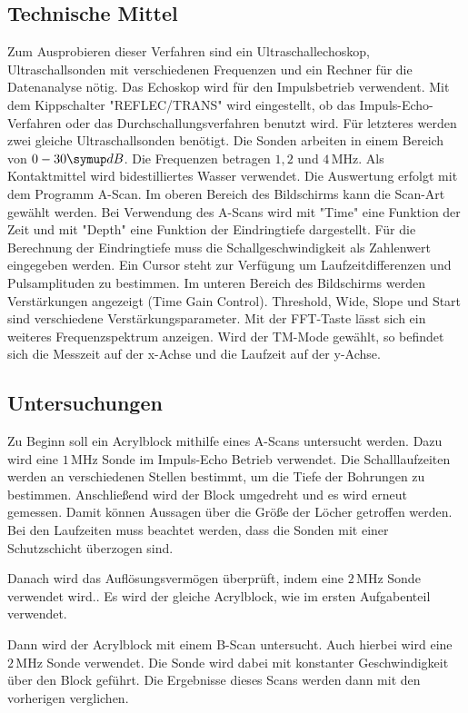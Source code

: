 \subsection{Technische Mittel}
Zum Ausprobieren dieser Verfahren sind ein Ultraschallechoskop, Ultraschallsonden
mit verschiedenen Frequenzen und ein Rechner für die Datenanalyse nötig. Das
Echoskop wird für den Impulsbetrieb verwendent. Mit dem Kippschalter
"REFLEC/TRANS" wird eingestellt, ob das Impuls-Echo-Verfahren oder das
Durchschallungsverfahren benutzt wird. Für letzteres werden zwei gleiche
Ultraschallsonden benötigt. Die Sonden arbeiten in einem Bereich von $0-30 \su{dB}$.
Die Frequenzen betragen $1,2$ und $4 \,\si{\mega\hertz}$. Als Kontaktmittel
wird bidestilliertes Wasser verwendet. Die Auswertung erfolgt mit dem
Programm A-Scan. Im oberen Bereich des Bildschirms kann die Scan-Art gewählt werden.
Bei Verwendung des A-Scans wird mit "Time" eine Funktion der Zeit und mit "Depth"
eine Funktion der Eindringtiefe dargestellt. Für die Berechnung der Eindringtiefe
muss die Schallgeschwindigkeit als Zahlenwert eingegeben werden. Ein Cursor
steht zur Verfügung um Laufzeitdifferenzen und Pulsamplituden zu bestimmen.
Im unteren Bereich des Bildschirms werden Verstärkungen angezeigt (Time Gain
Control). Threshold, Wide, Slope und Start sind verschiedene Verstärkungsparameter.
Mit der FFT-Taste lässt sich ein weiteres Frequenzspektrum anzeigen.
Wird der TM-Mode gewählt, so befindet sich die Messzeit auf der x-Achse und
die Laufzeit auf der y-Achse.

\subsection{Untersuchungen}
Zu Beginn soll ein Acrylblock mithilfe eines A-Scans untersucht werden. Dazu wird
eine $1 \,\si{\mega\hertz}$ Sonde im Impuls-Echo Betrieb verwendet. Die Schalllaufzeiten
werden an verschiedenen Stellen bestimmt, um die Tiefe der Bohrungen zu bestimmen.
Anschließend wird der Block umgedreht und es wird erneut gemessen. Damit können
Aussagen über die Größe der Löcher getroffen werden. Bei den Laufzeiten muss beachtet werden,
dass die Sonden mit einer Schutzschicht überzogen sind.

Danach wird das Auflösungsvermögen überprüft, indem eine $2 \,\si{\mega\hertz}$
Sonde verwendet wird.. Es wird der gleiche Acrylblock, wie im ersten Aufgabenteil verwendet.

Dann wird der Acrylblock mit einem B-Scan untersucht. Auch hierbei wird eine $2 \,\si{\mega\hertz}$
Sonde verwendet. Die Sonde wird dabei mit konstanter Geschwindigkeit über den Block geführt.
Die Ergebnisse dieses Scans werden dann mit den vorherigen verglichen.

